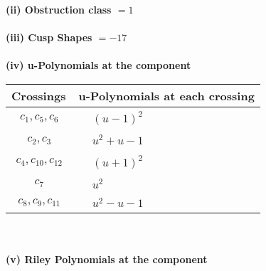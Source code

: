 \documentclass[1p]{elsarticle_modified}
\theoremstyle{definition}
\begin{document}
\flushleft \textbf{(ii) Obstruction class $= 1$}\\~\\
\flushleft \textbf{(iii) Cusp Shapes $= -17$}\\~\\
\newpage\renewcommand{\arraystretch}{1}
\flushleft \textbf{(iv) u-Polynomials at the component}\newline \\
\begin{tabular}{m{50pt}|m{274pt}}
Crossings & \hspace{64pt}u-Polynomials at each crossing \\
\hline $$\begin{aligned}c_{1},c_{5},c_{6}\end{aligned}$$&$\begin{aligned}
&(u-1)^2
\end{aligned}$\\
\hline $$\begin{aligned}c_{2},c_{3}\end{aligned}$$&$\begin{aligned}
&u^2+u-1
\end{aligned}$\\
\hline $$\begin{aligned}c_{4},c_{10},c_{12}\end{aligned}$$&$\begin{aligned}
&(u+1)^2
\end{aligned}$\\
\hline $$\begin{aligned}c_{7}\end{aligned}$$&$\begin{aligned}
&u^2
\end{aligned}$\\
\hline $$\begin{aligned}c_{8},c_{9},c_{11}\end{aligned}$$&$\begin{aligned}
&u^2- u-1
\end{aligned}$\\
\hline
\end{tabular}\\~\\
\newpage\renewcommand{\arraystretch}{1}
\flushleft \textbf{(v) Riley Polynomials at the component}\newline \\
\end{document}
